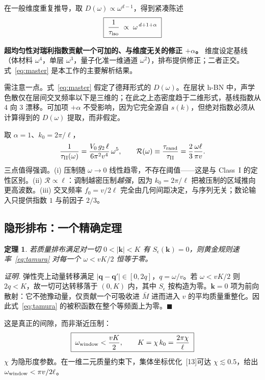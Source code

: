 \documentclass[10pt,twocolumn]{article}
\newcommand{\kzero}{k_{0}}
\newtheorem*{thm}{定理}
\begin{document}
在一般维度重复推导，取 $D(\omega)\propto\omega^{d-1}$，得到紧凑陈述
\begin{equation}
  \boxed{\;\frac{1}{\tau_{\rm iso}}\;\propto\;\omega^{\,d+1+\alpha}\;}
  \label{eq:master}
\end{equation}

\textbf{超均匀性对瑞利指数贡献一个可加的、与维度无关的修正 $+\alpha$。} 维度设定基线（体材料 $\omega^{4}$，单层 $\omega^{3}$，量子化准一维通道 $\omega^{2}$），排布提供修正；二者正交。式~\eqref{eq:master} 是本工作的主要解析结果。

需注意一点。式~\eqref{eq:master} 假定了德拜形式的 $D(\omega)$。在层状 h-BN 中，声学色散仅在层间交叉频率以下是三维的；在此之上态密度趋于二维形式，基线指数从 $4$ 向 $3$ 漂移。可加项 $+\alpha$ 不受影响，因为它完全源自 $s(k)$，但绝对指数必须从计算得到的 $D(\omega)$ 提取，而非假定。

取 $\alpha=1$、$\kzero=2\pi/\ell$，
\begin{equation}
  \frac{1}{\tau_{\rm II}(\omega)}
    = \frac{V_0\,g_2\,\ell}{6\pi^{2}v^{4}}\,\omega^{5},
  \qquad
  \mathcal{R}(\omega)\equiv\frac{\tau_{\rm rand}}{\tau_{\rm II}}
    = \frac{2}{3}\frac{\omega\ell}{\pi v}.
  \label{eq:classII}
\end{equation}
三点值得强调。(i) 压制随 $\omega\to0$ 线性趋零，不存在阈值——这是与 Class~I 的定性区别。(ii) $\mathcal{R}\propto\ell$：调制越密压制\emph{越强}，因为 $\kzero=2\pi/\ell$ 把被压制的区域推向更高波数。(iii) 交叉频率 $f_0=v/2\ell$ 完全由几何间距决定，与序列无关；数论输入只提供指数 $1$ 与前因子 $2/3$。

\subsection{隐形排布：一个精确定理}
\label{sec:stealthy}

\begin{thm}
若质量排布满足对一切 $0<|\bm k|<K$ 有 $S_\epsilon(\bm k)=0$，则黄金规则速率~\eqref{eq:tamura} 对每一个 $\omega<vK/2$ 恒等于零。
\end{thm}

\emph{证明.} 弹性壳上动量转移满足 $|\bm q-\bm q'|\in[0,2q]$，$q=\omega/v$。若 $\omega<vK/2$ 则 $2q<K$，故一切可达转移落于 $(0,K)$ 内，其中 $S_\epsilon$ 按构造为零。$\bm k=0$ 项为前向散射：它不弛豫动量，仅贡献一个可吸收进 $\bar M$ 进而进入 $v$ 的平均质量重整化。因此式~\eqref{eq:tamura} 的被积函数在整个等频面上为零。$\blacksquare$

这是真正的间隙，而非渐近压制：
\begin{equation}
  \boxed{\;\omega_{\rm window}<\frac{vK}{2},
  \qquad K=\chi\,\kzero=\frac{2\pi\chi}{\ell}\;}
  \label{eq:window}
\end{equation}
$\chi$ 为隐形度参数。在一维二元质量约束下，集体坐标优化~[13]可达 $\chi\lesssim0.5$，给出 $\omega_{\rm window}<\pi v/2\ell$。
\end{document}
